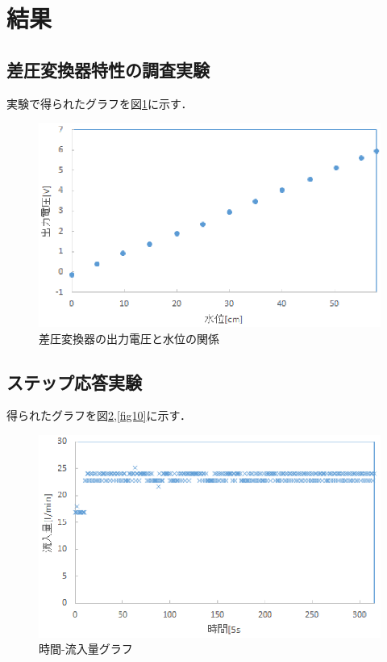 \documentclass[11pt,a4paper]{jsarticle}
\begin{document}
 \section{結果}
  \subsection{差圧変換器特性の調査実験}
  実験で得られたグラフを図\ref{fig8}に示す．
 \begin{figure}[h]
 \begin{center}
  \includegraphics[scale=1]{./picture/e6_1.eps}
  \caption{差圧変換器の出力電圧と水位の関係}
  \label{fig8}
 \end{center}
 \end{figure}

\newpage
\pagestyle{fancy}
\renewcommand{\headrulewidth}{0.0pt}
\cfoot{}
  \subsection{ステップ応答実験}
  得られたグラフを図\ref{fig9},\ref{fig10}に示す．
\begin{figure}[h]
 \begin{center}
  \includegraphics[scale=1]{./picture/e6_5.eps}
  \caption{時間-流入量グラフ}
  \label{fig9}
 \end{center}
\end{figure}
\end{document}
